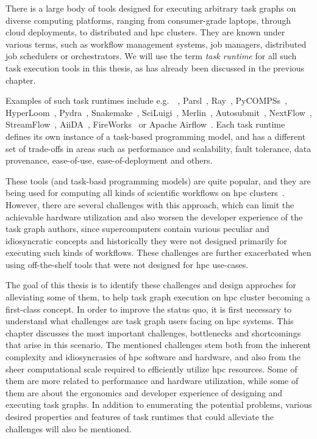 There is a large body of tools designed for executing arbitrary task graphs on diverse computing
platforms, ranging from consumer-grade laptops, through cloud deployments, to distributed and
\gls{hpc} clusters. They are known under various terms, such as workflow
management systems, job managers, distributed job schedulers or orchestrators. We will use the term
\emph{task runtime} for all such task execution tools in this thesis, as has already been
discussed in the previous chapter.

Examples of such task runtimes include e.g.\ \dask{}~\cite{dask},
Parsl~\cite{parsl}, Ray~\cite{ray},
PyCOMPSs~\cite{pycompss}, HyperLoom~\cite{hyperloom},
Pydra~\cite{pydra}, Snakemake~\cite{snakemake},
SciLuigi~\cite{sciluigi}, Merlin~\cite{merlin},
Autosubmit~\cite{autosubmit}, NextFlow~\cite{nextflow},
StreamFlow~\cite{streamflow}, AiiDA~\cite{aiida},
FireWorks~\cite{fireworks} or Apache Airflow~\cite{airfow}. Each task
runtime defines its own instance of a task-based programming model, and has a different set of
trade-offs in areas such as performance and scalability, fault tolerance, data provenance,
ease-of-use, ease-of-deployment and others.

These tools (and task-basd programming models) are quite popular, and they are being used for
computing all kinds of scientific workflows on \gls{hpc} clusters~\cite{hpc_tasks, hpc_tasks_2, hpc_tasks_3, pegasus}.
However, there are several challenges with this approach, which can limit the achievable
hardware utilization and also worsen the developer experience of the task graph authors, since
supercomputers contain various peculiar and idiosyncratic concepts and historically they were not designed
primarily for executing such kinds of workflows. These challenges are further exacerbated when using
off-the-shelf tools that were not designed for \gls{hpc} use-cases.

The goal of this thesis is to identify these challenges and design approches for alleviating
some of them, to help task graph execution on \gls{hpc} cluster becoming a first-class concept. In
order to improve the status quo, it is first necessary to understand what challenges are task graph
users facing on \gls{hpc} systems. This chapter discusses the most important challenges, bottlenecks
and shortcomings that arise in this scenario. The mentioned challenges stem both from the inherent
complexity and idiosyncrasies of \gls{hpc} software and hardware, and also from the sheer computational
scale required to efficiently utilize \gls{hpc} resources. Some of them are more related to performance
and hardware utilization, while some of them are about the ergonomics and developer experience of
designing and executing task graphs. In addition to enumerating the potential problems, various desired
properties and features of task runtimes that could alleviate the challenges will also be mentioned.

